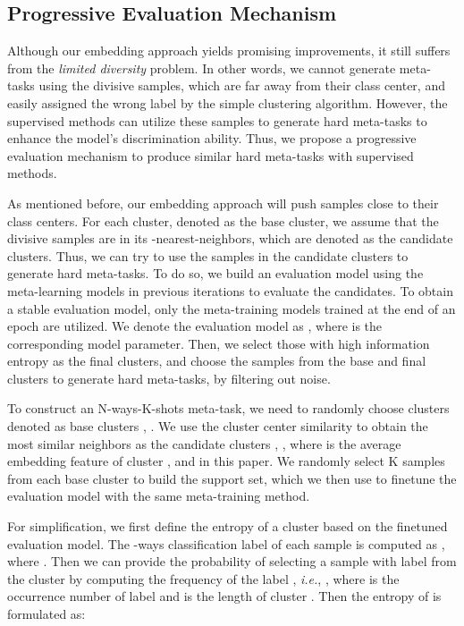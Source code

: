 \documentclass[runningheads]{llncs}
\begin{document}
\subsection{Progressive Evaluation Mechanism}
Although our embedding approach yields promising improvements, it still suffers from the \textit{limited diversity} problem. In other words, we cannot generate meta-tasks using the divisive samples, which are far away from their class center, and easily assigned the wrong label by the simple clustering algorithm. However, the supervised methods can utilize these samples to generate hard meta-tasks to enhance the model's discrimination ability. Thus, we propose a progressive evaluation mechanism to produce similar hard meta-tasks with supervised methods. 


As mentioned before, our embedding approach will push samples close to their class centers. For each cluster, denoted as the base cluster, we assume that the divisive samples are in its -nearest-neighbors, which are denoted as the candidate clusters. Thus, we can try to use the samples in the candidate clusters to generate hard meta-tasks. To do so, we build an evaluation model using the meta-learning models in previous iterations to evaluate the candidates. To obtain a stable evaluation model, only the meta-training models trained at the end of an epoch are utilized. We denote the evaluation model as , where  is the corresponding model parameter. Then, we select those with high information entropy as the final clusters, and choose the samples from the base and final clusters to generate hard meta-tasks, by filtering out noise. 





To construct an N-ways-K-shots meta-task, we need to randomly choose  clusters denoted as base clusters , . We use the cluster center similarity  to obtain the  most similar neighbors as the candidate clusters , , where  is the average embedding feature of cluster , and  in this paper. We randomly select K samples from each base cluster to build the support set, which we then use to finetune the evaluation model  with the same meta-training method. 

For simplification, we first define the entropy of a cluster  based on the finetuned evaluation model. The -ways classification label of each sample  is computed as 
, where . Then we can provide the probability  of selecting a sample with label  from the cluster  by computing the frequency of the label , \emph{i.e.}, , where  is the occurrence number of label  and  is the length of cluster . Then the entropy of  is formulated as: 
\end{document}
